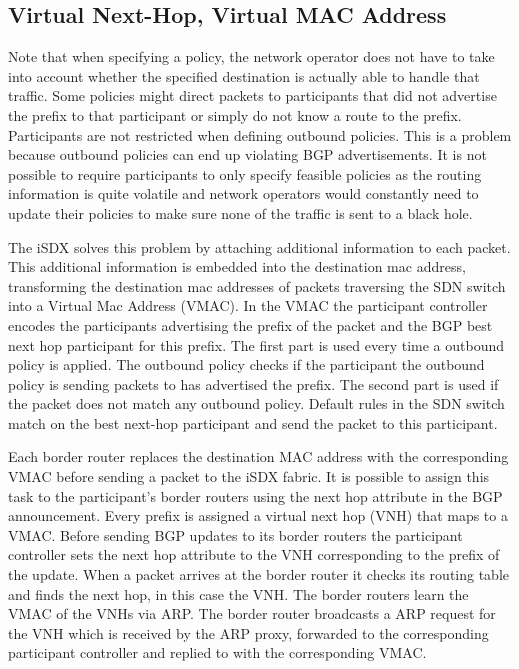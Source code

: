 \subsection{\label{chapter2:iSDX:VNH_VMAC}Virtual Next-Hop, Virtual MAC Address}


Note that when specifying a policy, the network operator does not have to take into account whether the specified destination  is actually able to handle that traffic. Some policies might direct packets to participants that did not advertise the prefix to that participant or simply do not know a route to the prefix. Participants are not restricted when defining outbound policies. This is a problem because outbound policies can end up violating BGP advertisements. It is not possible to require participants to only specify feasible policies as the routing information is quite volatile and network operators would constantly need to update their policies to make sure none of the traffic is sent to a black hole. 

The iSDX solves this problem by attaching additional information to each packet. This additional information is embedded into the destination mac address, transforming the destination mac addresses of packets traversing the SDN switch into a Virtual Mac Address (VMAC).
In the VMAC the participant controller encodes the participants advertising the prefix of the packet and the BGP best next hop participant for this prefix. The first part is used every time a outbound policy is applied. The outbound policy checks if the participant the outbound policy is sending packets to has advertised the prefix. The second part is used if the packet does not match any outbound policy. Default rules in the SDN switch match on the best next-hop participant and send the packet to this participant.

Each border router replaces the destination MAC address with the corresponding VMAC before sending a packet to the iSDX fabric. It is possible to assign this task to the participant's border routers using the next hop attribute in the BGP announcement. Every prefix is assigned a virtual next hop (VNH) that maps to a VMAC. Before sending BGP updates to its border routers the participant controller sets the next hop attribute to the VNH corresponding to the prefix of the update.  When a packet arrives at the border router it checks its routing table and finds the next hop, in this case the VNH. The border routers learn the VMAC of the VNHs via ARP. The border router broadcasts a ARP request for the VNH which is received by the ARP proxy, forwarded to the corresponding participant controller and replied to with the corresponding VMAC.

